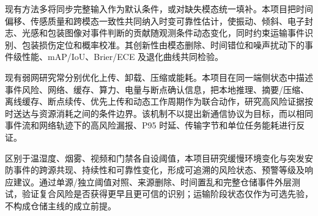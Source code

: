 \justifying
\NSFCBodyText


现有方法多将同步完整输入作为默认条件，或对缺失模态统一填补。本项目把时间偏移、传感质量和跨模态一致性共同纳入时变可靠性估计，使振动、倾斜、电子封志、光感和包装图像对事件判断的贡献随观测条件动态变化，同时约束运输事件识别、包装损伤定位和概率校准。其创新性由模态删除、时间错位和噪声扰动下的事件级性能、mAP/IoU、Brier/ECE 及退化曲线共同检验。


现有弱网研究常分别优化上传、卸载、压缩或能耗。本项目在同一端侧状态中描述事件风险、网络、缓存、算力、电量与断点确认信息，把本地推理、摘要/压缩、离线缓存、断点续传、优先上传和动态工作周期作为联合动作，研究高风险证据按时送达与资源消耗之间的条件边界。该机制不以提出新通信协议为目标，而以相同事件流和网络轨迹下的高风险漏报、P95 时延、传输字节和单位任务能耗进行反证。


区别于温湿度、烟雾、视频和门禁各自设阈值，本项目研究缓慢环境变化与突发安防事件的跨源共现、持续性和可靠性变化，形成可追溯的风险状态、预警等级及响应建议。通过单源/独立阈值对照、来源删除、时间置乱和完整仓储事件外层测试，验证复合风险是否获得更早且更可信的识别；运输阶段状态仅作为可选先验，不构成仓储主线的成立前提。
